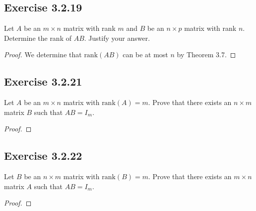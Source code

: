 \subsection*{Exercise 3.2.19} Let \( A  \) be an \( m \times n  \) matrix with rank \(  m  \) and \( B  \) be an \( n \times p  \) matrix with rank \( n  \). Determine the rank of \( AB  \). Justify your answer.
\begin{proof}
    We determine that \( \text{rank}(AB)   \) can be at most \( n  \) by Theorem 3.7. 
\end{proof}

\subsection*{Exercise 3.2.21} Let \( A  \) be an \( m \times n  \) matrix with \( \text{rank}(A) = m  \). Prove that there exists an \( n \times m  \) matrix \( B  \) such that \( AB = {I}_{m} \).
\begin{proof}

\end{proof}

\subsection*{Exercise 3.2.22} Let \( B  \) be an \( n \times m  \) matrix with \( \text{rank}(B) = m  \). Prove that there exists an \( m \times n \) matrix \( A  \) such that \( AB = {I}_{m} \).
\begin{proof}

\end{proof}

